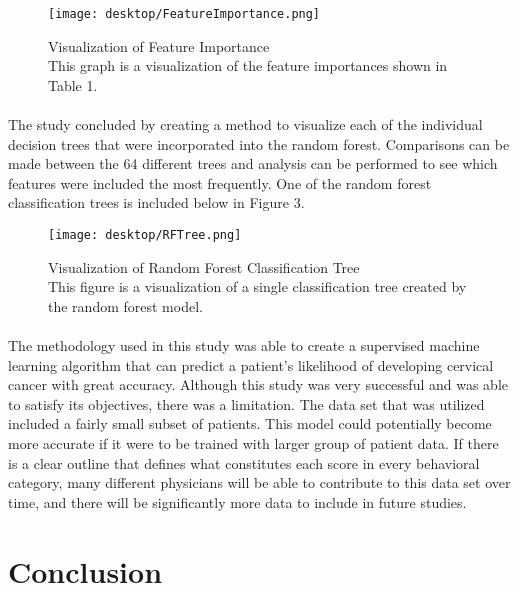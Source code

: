 \documentclass[10pt, oneside, twocolumn]{article}
\begin{document}
\begin{figure}[htbp]
\centering
\texttt{[image: desktop/FeatureImportance.png]}
\caption{Visualization of Feature Importance\\This graph is a visualization of the feature importances shown in Table 1.}
\end{figure}

\paragraph{} 
The study concluded by creating a method to visualize each of the individual decision trees that were incorporated into the random forest. Comparisons can be made between the 64 different trees and analysis can be performed to see which features were included the most frequently. One of the random forest classification trees is included below in Figure 3. 

\begin{figure}[htbp]
\centering
\texttt{[image: desktop/RFTree.png]}
\caption{Visualization of Random Forest Classification Tree\\This figure is a visualization of a single classification tree created by the random forest model.}
\end{figure}

\paragraph{} 
The methodology used in this study was able to create a supervised machine learning algorithm that can predict a patient’s likelihood of developing cervical cancer with great accuracy. Although this study was very successful and was able to satisfy its objectives, there was a limitation. The data set that was utilized included a fairly small subset of patients. This model could potentially become more accurate if it were to be trained with larger group of patient data. If there is a clear outline that defines what constitutes each score in every behavioral category, many different physicians will be able to contribute to this data set over time, and there will be significantly more data to include in future studies.

\section{Conclusion}
\end{document}
